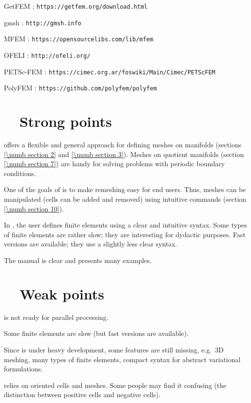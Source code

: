 GetFEM : {\small\tt https://getfem.org/download.html}

gmsh : {\small\tt http://gmsh.info}

MFEM : {\small\tt https://opensourcelibs.com/lib/mfem}

OFELI : {\small\tt http://ofeli.org/}

PETSc-FEM : {\small\tt https://cimec.org.ar/foswiki/Main/Cimec/PETScFEM}

PolyFEM : {\small\tt https://github.com/polyfem/polyfem}


\section{~~Strong points}\label{\numb section 1.\numb parag 8}

{\ManiFEM} offers a flexible and general approach for defining meshes on manifolds
(sections \ref{\numb section 2} and \ref{\numb section 3}).
Meshes on quotient manifolds (section \ref{\numb section 7}) are handy for solving
problems with periodic boundary conditions.

One of the goals of {\maniFEM} is to make remeshing easy for end users.
Thus, meshes can be manipulated (cells can be added and removed) using intuitive commands
(section \ref{\numb section 10}).

In {\maniFEM}, the user defines finite elements using a clear and intuitive syntax.
Some types of finite elements are rather slow; they are interesting for dydactic purposes.
Fast versions are available; they use a slightly less clear syntax.

The manual is clear and presents many examples.


\section{~~Weak points}\label{\numb section 1.\numb parag 9}

{\ManiFEM} is not ready for parallel processing.

Some finite elements are slow (but fast versions are available).

Since {\maniFEM} is under heavy development, some features are still missing,
e.g.\ 3D meshing, many types of finite elements, compact syntax for abstract variational
formulations.

{\ManiFEM} relies on oriented cells and meshes.
Some people may find it confusing (the distinction between positive cells and negative cells).
